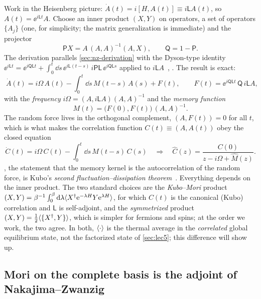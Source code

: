 Work in the Heisenberg picture: $\dot A(t)=i[H,A(t)]\equiv i\mathsf LA(t)$, so $A(t)=\ee^{i\mathsf Lt}A$.
Choose an inner product $(X,Y)$ on operators, a set of operators $\{A_j\}$ (one, for simplicity; the matrix generalization is immediate) and the projector
\begin{equation}
  \mathsf PX=A\,(A,A)^{-1}(A,X),\qquad \mathsf Q=1-\mathsf P .
\end{equation}
The derivation parallels \cref{sec:nz-derivation} with the Dyson-type identity $\ee^{i\mathsf Lt}=\ee^{i\mathsf Q\mathsf Lt}+\int_0^t\dd s\,\ee^{i\mathsf L(t-s)}\,i\mathsf P\mathsf L\,\ee^{i\mathsf Q\mathsf Ls}$ applied to $i\mathsf LA$~\cite[Ch.~8]{ZwanzigBook}, \cite[Secs.~5.2--5.3]{Forster1975}.
The result is exact:
\begin{equation}
  \boxed{\;\dot A(t)=i\Omega\,A(t)-\int_0^t\!\dd s\,M(t-s)\,A(s)+F(t),\qquad
  F(t)=\ee^{i\mathsf Q\mathsf Lt}\,\mathsf Q\,i\mathsf LA,\;}
  \label{eq:GLE}
\end{equation}
with the \emph{frequency} $i\Omega=(A,i\mathsf LA)(A,A)^{-1}$ and the \emph{memory function}
\begin{equation}
  M(t)=\big(F(0),F(t)\big)\,(A,A)^{-1}.
  \label{eq:memory-fn}
\end{equation}
The random force lives in the orthogonal complement, $(A,F(t))=0$ for all $t$, which is what makes the correlation function $C(t)\equiv(A,A(t))$ obey the closed equation
\begin{equation}
  \dot C(t)=i\Omega\,C(t)-\int_0^t\!\dd s\,M(t-s)\,C(s)
  \quad\Longrightarrow\quad
  \hat C(z)=\frac{C(0)}{z-i\Omega+\hat M(z)} .
  \label{eq:MoriDyson}
\end{equation}
, the statement that the memory kernel is the autocorrelation of the random force, is Kubo's \emph{second fluctuation--dissipation theorem}~\cite{Kubo1966}.
Everything depends on the inner product.
The two standard choices are the \emph{Kubo--Mori} product $(X,Y)=\beta^{-1}\int_0^\beta\mathrm{d}\lambda\langle X^\dagger\mathrm{e}^{-\lambda H}Y\mathrm{e}^{\lambda H}\rangle$, for which $C(t)$ is the canonical (Kubo) correlation and $\mathsf L$ is self-adjoint, and the \emph{symmetrized} product $(X,Y)=\tfrac12\langle\{X^\dagger,Y\}\rangle$, which is simpler for fermions and spins; at the order we work, the two agree.
In both, $\langle\cdot\rangle$ is the thermal average in the \emph{correlated} global equilibrium state, not the factorized state of \cref{sec:lec5}; this difference will show up.

\subsection{Mori on the complete basis is the adjoint of Nakajima--Zwanzig}

